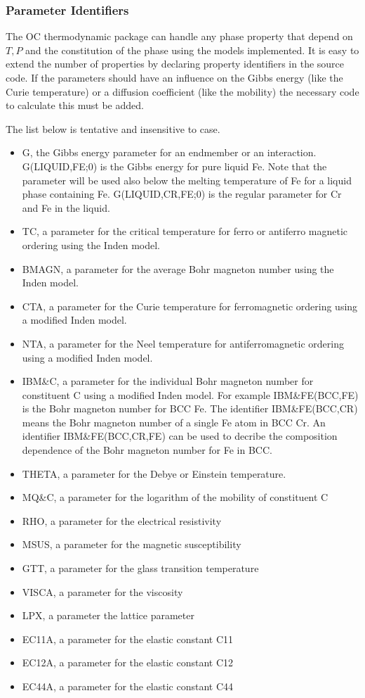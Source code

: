 \documentclass[12pt]{article}
\begin{document}
\subsubsection{Parameter Identifiers}\label{sc:paramid}

The OC thermodynamic package can handle any phase property that depend
on $T, P$ and the constitution of the phase using the models
implemented.  It is easy to extend the number of properties by
declaring property identifiers in the source code.  If the parameters
should have an influence on the Gibbs energy (like the Curie
temperature) or a diffusion coefficient (like the mobility) the
necessary code to calculate this must be added.

The list below is tentative and insensitive to case.

\begin{itemize}
\item G, the Gibbs energy parameter for an endmember or an
  interaction.  G(LIQUID,FE;0) is the Gibbs energy for pure liquid Fe.
  Note that the parameter will be used also below the melting
  temperature of Fe for a liquid phase containing Fe.  G(LIQUID,CR,FE;0)
  is the regular parameter for Cr and Fe in the liquid.
\item TC, a parameter for the critical temperature for ferro or
  antiferro magnetic ordering using the Inden model.
\item BMAGN, a parameter for the average Bohr magneton number using
  the Inden model.
\item CTA, a parameter for the Curie temperature for ferromagnetic
  ordering using a modified Inden model.
\item NTA, a parameter for
 the Neel temperature for antiferromagnetic
  ordering using a modified Inden model.
\item IBM\&C, a parameter for the individual Bohr magneton number for
  constituent C using a modified Inden model.  For example
  IBM\&FE(BCC,FE) is the Bohr magneton number for BCC Fe.  The
  identifier IBM\&FE(BCC,CR) means the Bohr magneton number of a
  single Fe atom in BCC Cr.  An identifier IBM\&FE(BCC,CR,FE) can be
  used to decribe the composition dependence of the Bohr magneton
  number for Fe in BCC.
\item THETA, a parameter for the Debye or Einstein temperature.
\item MQ\&C, a parameter for the logarithm of the mobility of
  constituent C
\item RHO, a parameter for the electrical resistivity
\item MSUS, a parameter for the magnetic susceptibility
\item GTT, a parameter for the glass transition temperature
\item VISCA, a parameter for the viscosity
\item LPX, a parameter the lattice parameter
\item EC11A, a parameter for the elastic constant C11
\item EC12A, a parameter for the elastic constant C12
\item EC44A, a parameter for the elastic constant C44
\end{itemize}
\end{document}
